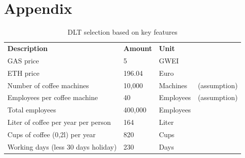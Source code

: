 \documentclass[conference]{IEEEtran}
\begin{document}
\newpage

\section*{Appendix}
\label{appendix}

\begin{table}[!htbp]
\centering
\caption{DLT selection based on key features}
\begin{tabular}{llll}
\textbf{Description}                         & \textbf{Amount}     & \textbf{Unit}                                                 & \textbf{}                                                           \\
GAS price                                    & 5                   & GWEI                                                          &                                                                     \\
ETH price                                    & 196.04              & Euro                                                          &                                                                     \\
Number of coffee machines                    & 10,000              & Machines                                                      & (assumption)                                                        \\
Employees per coffee machine                 & 40                  & Employees                                                     & (assumption)                                                        \\
Total employees                              & 400,000             & Employees                                                     &                                                                     \\
Liter of coffee per year per person          & 164                 & Liter                                                         &                                                                     \\
Cups of coffee (0,2l) per year               & 820                 & Cups                                                          &                                                                     \\
Working days (less 30 days holiday)          & 230                 & Days                                                          &                                                                     \\

\end{tabular}
\end{table}
\end{document}
